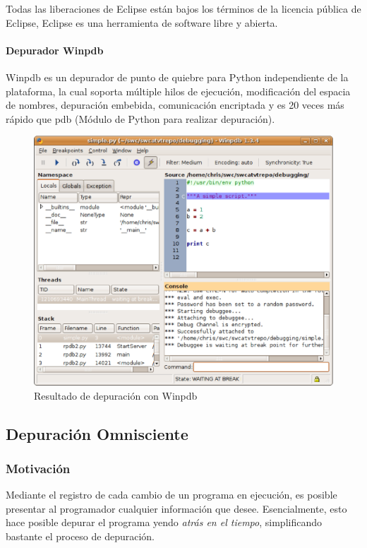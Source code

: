 \documentclass[12pt,legalpaper]{report}
\begin{document}
Todas las liberaciones de Eclipse están bajos los términos de la licencia pública de Eclipse, Eclipse es una herramienta de software libre y abierta.

				\paragraph{Depurador Winpdb }	

Winpdb es un depurador de punto de quiebre para Python independiente de la plataforma, la cual soporta múltiple hilos de ejecución, modificación del espacia de nombres, depuración embebida, comunicación encriptada y es 20 veces más rápido que pdb (Módulo de Python para realizar depuración).

\begin{figure}[hbp]
	\centering
	\includegraphics[scale=0.35]{images/Winpdb.eps}
	\caption{Resultado de depuración con Winpdb}
\end{figure}


		\subsection{Depuración Omnisciente}
			\subsubsection{Motivación}

Mediante el registro de cada cambio de un programa en ejecución, es posible presentar al programador cualquier información que desee.  Esencialmente, esto hace posible depurar el programa yendo \textit{atrás en el tiempo}, simplificando bastante el proceso de depuración.
\end{document}
